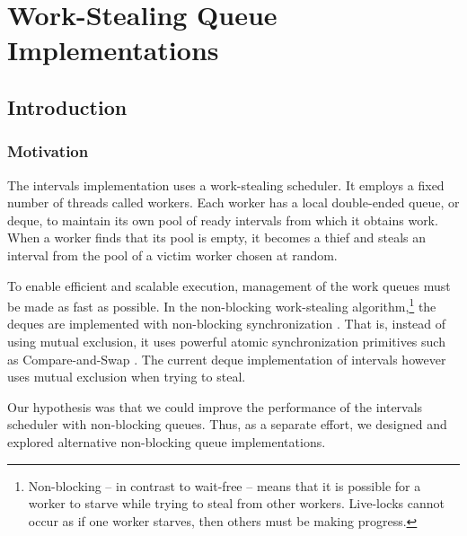 
\part{Work-Stealing Queue Implementations}
\label{part:queues}

\chapter{Introduction}
\label{chap:queues-introduction}

\section{Motivation}
\label{sec:queues-intro-motivation}

The intervals implementation uses a work-stealing scheduler. It
employs a fixed number of threads called workers. Each worker has a
local double-ended queue, or deque, to maintain its own pool of ready
intervals from which it obtains work. When a worker finds that its
pool is empty, it becomes a thief and steals an interval from the pool
of a victim worker chosen at random.


To enable efficient and scalable execution, management of the work
queues must be made as fast as possible. In the non-blocking
work-stealing algorithm,\footnote{Non-blocking -- in contrast to
  wait-free \cite{Herlihy1991} -- means that it is possible for a
  worker to starve while trying to steal from other
  workers. Live-locks cannot occur as if one worker starves, then
  others must be making progress.} the deques are implemented with
non-blocking synchronization \cite{Arora2001}. That is, instead of
using mutual exclusion, it uses powerful atomic synchronization
primitives such as Compare-and-Swap \cite{Moir1997}. The current deque
implementation of intervals however uses mutual exclusion when trying
to steal.

Our hypothesis was that we could improve the performance of the
intervals scheduler with non-blocking queues. Thus, as a separate
effort, we designed and explored alternative non-blocking queue
implementations.

